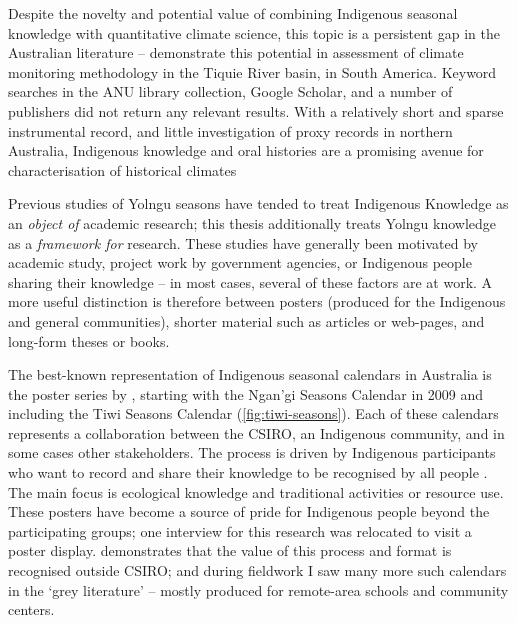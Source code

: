 Despite the novelty and potential value of combining Indigenous seasonal
knowledge with quantitative climate science, this topic is a persistent gap
in the Australian literature -- \citet{cochran2015} demonstrate this potential
in assessment of climate monitoring methodology in the Tiquie River basin,
in South America.  Keyword searches in the ANU library collection, Google
Scholar, and a number of publishers did not return any relevant results.
With a relatively short and sparse instrumental record, and little investigation
of proxy records in northern Australia, Indigenous knowledge and oral histories
are a promising avenue for characterisation of historical climates


Previous studies of Yolngu seasons have tended to treat Indigenous Knowledge
as an \emph{object of} academic research; this thesis additionally treats
Yolngu knowledge as a \emph{framework for} research.  These studies have generally
been motivated by academic study, project work by government agencies, or
Indigenous people sharing their knowledge -- in most cases, several of these
factors are at work.  A more useful distinction is therefore between posters
(produced for the Indigenous and general communities), shorter material such
as articles or web-pages, and long-form theses or books.

The best-known representation of Indigenous seasonal calendars in Australia
is the poster series by \citet{CSIROcals}, starting with the
Ngan'gi Seasons Calendar in 2009 and including the Tiwi Seasons Calendar
(\cref{fig:tiwi-seasons}).  Each of these calendars represents a
collaboration between the CSIRO, an Indigenous community, and in some
cases other stakeholders.  The process is driven by Indigenous participants
who want to record and share their knowledge to be recognised by all people
\citep{woodward2010,oconnor2010}.  The main focus is ecological knowledge and
traditional activities or resource use.  These posters have become a source of
pride for Indigenous people beyond the participating groups; one interview
for this research was relocated to visit a poster display.  \citet{gotha2012}
demonstrates that the value of this process and format is recognised outside
CSIRO; and during fieldwork I saw many more such calendars in the `grey
literature' -- mostly produced for remote-area schools and community centers.


